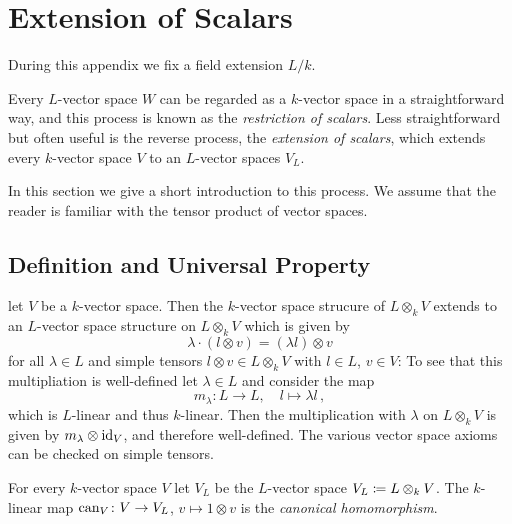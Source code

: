\section{Extension of Scalars}
\label{appendix: extension of scalars}


\begin{conventions}
  During this appendix we fix a field extension $L/k$.
\end{conventions}


\begin{fluff}
  Every $L$-vector space $W$ can be regarded as a $k$-vector space in a straightforward way, and this process is known as the \emph{restriction of scalars}.
  Less straightforward but often useful is the reverse process, the \emph{extension of scalars}, which extends every $k$-vector space $V$ to an $L$-vector spaces $V_L$.
  
  In this section we give a short introduction to this process.
  We assume that the reader is familiar with the tensor product of vector spaces.
\end{fluff}



\subsection{Definition and Universal Property}


\begin{fluff}
  let $V$ be a $k$-vector space.
  Then the $k$-vector space strucure of $L \otimes_k V$ extends to an $L$-vector space structure on $L \otimes_k V$ which is given by
  \[
      \lambda \cdot (l \otimes v)
    = (\lambda l) \otimes v
  \]
  for all $\lambda \in L$ and simple tensors $l \otimes v \in L \otimes_k V$ with $l \in L$, $v \in V$:
  To see that this multipliation is well-defined let $\lambda \in L$ and consider the map
  \[
            m_\lambda
    \colon  L
    \to     L,
    \quad   l
    \mapsto \lambda l \,,
  \]
  which is $L$-linear and thus $k$-linear.
  Then the multiplication with $\lambda$ on $L \otimes_k V$ is given by $m_\lambda \otimes \operatorname{id}_V$, and therefore well-defined.
  The various vector space axioms can be checked on simple tensors.
\end{fluff}


\begin{definition}
  For every $k$-vector space $V$ let $V_L$ be the $L$-vector space $V_L \coloneqq L \otimes_k V$.
  The $k$-linear map $\operatorname{can}_V \colon V \to V_L$, $v \mapsto 1 \otimes v$ is the \emph{canonical homomorphism}.
\end{definition}


